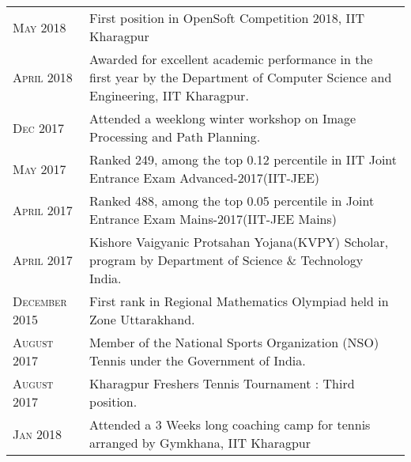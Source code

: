 \documentclass[a4paper,10pt]{extarticle} %
\begin{document}
\begin{tabularx}{\linewidth}{ l | X }

\textsc{May 2018} & First position in OpenSoft Competition 2018, IIT Kharagpur \\
\textsc{April 2018} & Awarded for excellent academic performance in the first year by the Department of Computer Science and Engineering, IIT Kharagpur. \\
\textsc{Dec 2017} & Attended a weeklong winter workshop on Image Processing and Path Planning. \\
\textsc{May 2017} & Ranked 249, among the top 0.12 percentile in IIT Joint Entrance Exam Advanced-2017(IIT-JEE) \\
\textsc{April 2017} & Ranked 488, among the top 0.05 percentile in Joint Entrance Exam Mains-2017(IIT-JEE Mains) \\
\textsc{April 2017} & Kishore Vaigyanic Protsahan Yojana(KVPY) Scholar, program by Department of Science \& Technology India.\\
\textsc{December 2015} & First rank in Regional Mathematics Olympiad held in Zone Uttarakhand. \\
\textsc{August 2017} & Member of the National Sports Organization (NSO) Tennis under the Government of India. \\
\textsc{August 2017} & Kharagpur Freshers Tennis Tournament : Third position. \\
\textsc{Jan 2018} & Attended a 3 Weeks long coaching camp for tennis arranged by Gymkhana, IIT Kharagpur
\end{tabularx}







\end{document}

